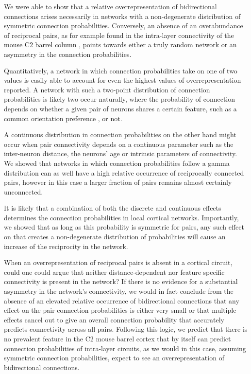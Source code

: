 
We were able to show that a relative overrepresentation of bidirectional connections arises necessarily in networks with a non-degenerate distribution of symmetric connection probabilities. Conversely, an absence of an overabundance of reciprocal pairs, as for example found in the intra-layer connectivity of the mouse C2 barrel column \cite{Lefort2009}, points towards either a truly random network or an asymmetry in the connection probabilities. 

Quantitatively, a network in which connection probabilities take on one of two values is easily able to account for even the highest values of overrepresentation reported. A network with such a two-point distribution of connection probabilities is likely two occur naturally, where the probability of connection depends on whether a given pair of neurons shares a certain feature, such as a common orientation preference \cite{Lee2016}, or not. 

A continuous distribution in connection probabilities on the other hand might occur when pair connectivity depends on a continuous parameter such as the inter-neuron distance, the neurons' age or intrinsic parameters of connectivity. We showed that networks in which connection probabilities follow a gamma distribution can as well have a high relative occurrence of reciprocally connected pairs, however in this case a larger fraction of pairs remains almost certainly unconnected.

It is likely that a combination of both the discrete and continuous effects determines the connection probabilities in local cortical networks. Importantly, we showed that as long as this probability is symmetric for pairs, any such effect on that creates a non-degenerate distribution of probabilities will cause an increase of the reciprocity in the network.

When an overrepresentation of reciprocal pairs is absent in a cortical circuit, could one could argue that neither distance-dependent nor feature specific connectivity is present in the network? If there is no evidence for a substantial asymmetry in the network's connectivity, we would in fact conclude from the absence of an elevated relative occurrence of bidirectional connections that any effect on the pair connection probabilities is either very small or that multiple effects cancel out to give an overall connection probability that accurately predicts connectivity across all pairs. Following this logic, we predict that there is no prevalent feature in the C2 mouse barrel cortex that by itself can predict connection probabilities of intra-layer circuits, as we would in this case, assuming symmetric connection probabilities, expect to see an overrepresentation of bidirectional connections.

